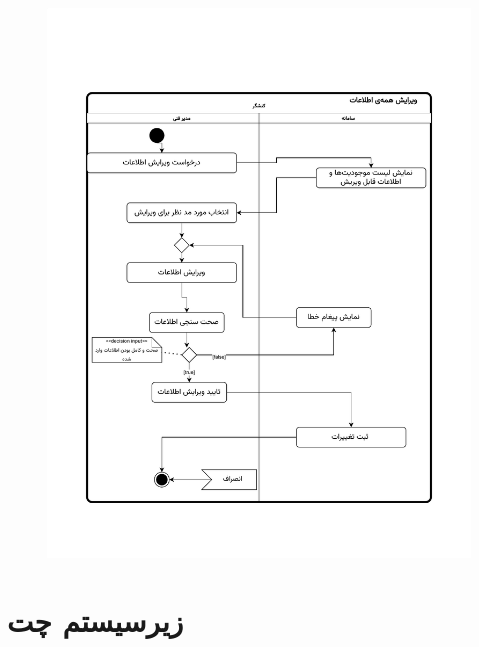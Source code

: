 \begin{figure}[ht!]
	\centering
	\includegraphics[scale=0.8, page=1]{figs/OOD-activity-editall.pdf}
\end{figure}
\FloatBarrier
\newpage



\section{زیرسیستم چت}


